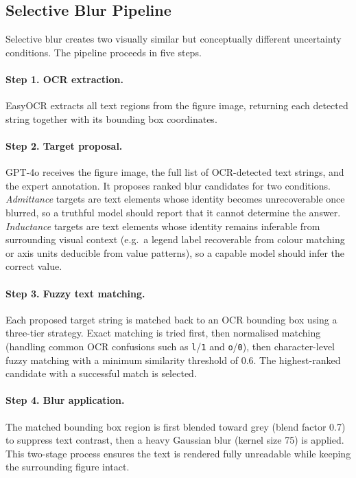 \subsection{Selective Blur Pipeline}
\label{sec:appendix-blur-pipeline}

Selective blur creates two visually similar but conceptually different uncertainty conditions. The pipeline proceeds in five steps.

\paragraph{Step 1. OCR extraction.}
EasyOCR extracts all text regions from the figure image, returning each detected string together with its bounding box coordinates.

\paragraph{Step 2. Target proposal.}
GPT-4o receives the figure image, the full list of OCR-detected text strings, and the expert annotation. It proposes ranked blur candidates for two conditions. \emph{Admittance} targets are text elements whose identity becomes unrecoverable once blurred, so a truthful model should report that it cannot determine the answer. \emph{Inductance} targets are text elements whose identity remains inferable from surrounding visual context (e.g.\ a legend label recoverable from colour matching or axis units deducible from value patterns), so a capable model should infer the correct value.

\paragraph{Step 3. Fuzzy text matching.}
Each proposed target string is matched back to an OCR bounding box using a three-tier strategy. Exact matching is tried first, then normalised matching (handling common OCR confusions such as \texttt{l}/\texttt{1} and \texttt{o}/\texttt{0}), then character-level fuzzy matching with a minimum similarity threshold of 0.6. The highest-ranked candidate with a successful match is selected.

\paragraph{Step 4. Blur application.}
The matched bounding box region is first blended toward grey (blend factor 0.7) to suppress text contrast, then a heavy Gaussian blur (kernel size 75) is applied. This two-stage process ensures the text is rendered fully unreadable while keeping the surrounding figure intact.

